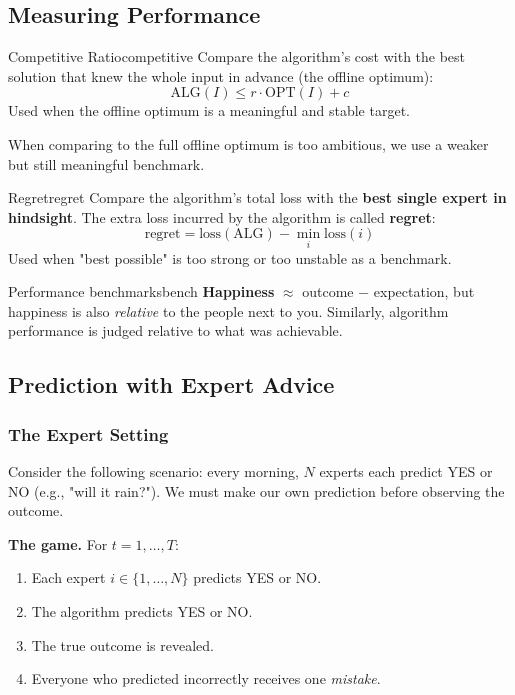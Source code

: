 \subsection{Measuring Performance}

\begin{definition}{Competitive Ratio}{competitive}
Compare the algorithm's cost with the best solution that knew the whole input in advance (the offline optimum):
\[
\mathrm{ALG}(I) \leq r \cdot \mathrm{OPT}(I) + c
\]
Used when the offline optimum is a meaningful and stable target.
\end{definition}

When comparing to the full offline optimum is too ambitious, we use a weaker but still meaningful benchmark.

\begin{definition}{Regret}{regret}
Compare the algorithm's total loss with the \textbf{best single expert in hindsight}. The extra loss incurred by the algorithm is called \textbf{regret}:
\[
\text{regret} = \mathrm{loss}(\mathrm{ALG}) - \min_i \mathrm{loss}(i)
\]
Used when "best possible" is too strong or too unstable as a benchmark.
\end{definition}

\begin{remark}{Performance benchmarks}{bench}
\textbf{Happiness} $\approx$ outcome $-$ expectation, but happiness is also \textit{relative} to the people next to you. Similarly, algorithm performance is judged relative to what was achievable.
\end{remark}

\subsection{Prediction with Expert Advice}

\subsubsection{The Expert Setting}

Consider the following scenario: every morning, $N$ experts each predict YES or NO (e.g., "will it rain?"). We must make our own prediction before observing the outcome.

\textbf{The game.} For $t = 1, \ldots, T$:
\begin{enumerate}
  \item Each expert $i \in \{1, \ldots, N\}$ predicts YES or NO.
  \item The algorithm predicts YES or NO.
  \item The true outcome is revealed.
  \item Everyone who predicted incorrectly receives one \textit{mistake}.
\end{enumerate}

